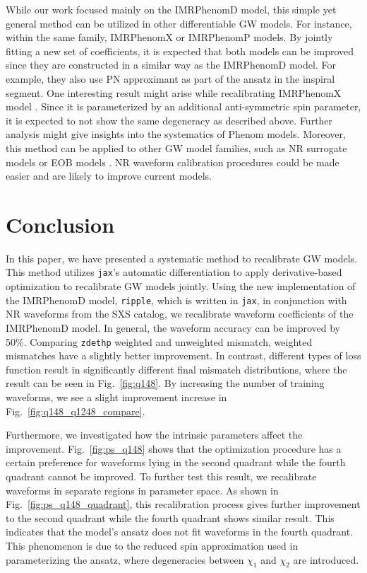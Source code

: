 \documentclass[twocolumn]{aastex631}
\newcommand{\ripple}{\texttt{ripple}}
\newcommand{\jax}{\texttt{jax}}
\newcommand{\zdethp}{\texttt{zdethp}}
\begin{document}
While our work focused mainly on the IMRPhenomD model, this simple yet general
method can be utilized in other differentiable GW models. For instance, within
the same family, IMRPhenomX \citep{pratten2020setting} or IMRPhenomP
\citep{hannam2014simple} models. By jointly fitting a new set of coefficients,
it is expected that both models can be improved since they are constructed in a
similar way as the IMRPhenomD model. For example, they also use PN approximant
as part of the ansatz in the inspiral segment. One interesting result might
arise while recalibrating IMRPhenomX model \citep{pratten2020setting}. Since it
is parameterized by an additional anti-symmetric spin parameter, it is expected
to not show the same degeneracy as described above. Further analysis might give
insights into the systematics of Phenom models. Moreover, this method can be
applied to other GW model families, such as NR surrogate models
\citep{varma2019surrogate} or EOB models \citep{taracchini2014effective}. NR
waveform calibration procedures could be made easier and are likely to improve
current models.


\section{Conclusion} \label{sec:conclusion}

In this paper, we have presented a systematic method to recalibrate GW models.
This method utilizes {\jax}'s automatic differentiation to apply
derivative-based optimization to recalibrate GW models jointly. Using the new
implementation of the IMRPhenomD model, {\ripple}, which is written in \jax, in
conjunction with NR waveforms from the SXS catalog, we recalibrate waveform
coefficients of the IMRPhenomD model. In general, the waveform accuracy can be
improved by 50\%. Comparing {\zdethp} weighted and unweighted mismatch, weighted
mismatches have a slightly better improvement. In contrast, different types of
loss function result in significantly different final mismatch distributions,
where the result can be seen in Fig.~\ref{fig:q148}. By increasing the number of
training waveforms, we see a slight improvement increase in
Fig.~\ref{fig:q148_q1248_compare}. 

Furthermore, we investigated how the intrinsic parameters affect the
improvement. Fig.~\ref{fig:ps_q148} shows that the optimization procedure has a
certain preference for waveforms lying in the second quadrant while the fourth
quadrant cannot be improved. To further test this result, we recalibrate
waveforms in separate regions in parameter space. As shown in
Fig.~\ref{fig:ps_q148_quadrant}, this recalibration process gives further
improvement to the second quadrant while the fourth quadrant shows similar
result. This indicates that the model's ansatz does not fit waveforms in the
fourth quadrant. This phenomenon is due to the reduced spin approximation used
in parameterizing the ansatz, where degeneracies between $\chi_1$ and $\chi_2$
are introduced. 
\end{document}
